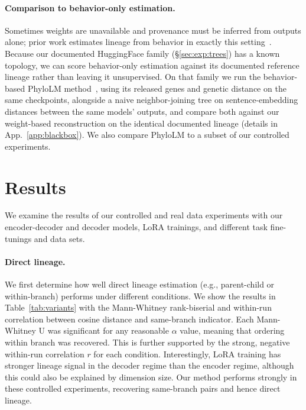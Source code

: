 \documentclass{article}
\theoremstyle{definition}
\theoremstyle{plain}
\begin{document}
\paragraph{Comparison to behavior-only estimation.}
\label{sec:exp:blackbox}
Sometimes weights are unavailable and provenance must be inferred from outputs alone; prior work estimates lineage from behavior in exactly this setting~\citep{wu2026llmdna, yax2025phylolm}. Because our documented HuggingFace family (\S\ref{sec:exp:trees}) has a known topology, we can score behavior-only estimation against its documented reference lineage rather than leaving it unsupervised. On that family we run the behavior-based PhyloLM method~\citep{yax2025phylolm}, using its released genes and genetic distance on the same checkpoints, alongside a naive neighbor-joining tree on sentence-embedding distances between the same models' outputs, and compare both against our weight-based reconstruction on the identical documented lineage (details in App.~\ref{app:blackbox}). We also compare PhyloLM to a subset of our controlled experiments.


\section{Results}
\label{sec:results}


We examine the results of our controlled and real data experiments with our encoder-decoder and decoder models, LoRA trainings, and different task fine-tunings and data sets.


\paragraph{Direct lineage.}
We first determine how well direct lineage estimation (e.g., parent-child or within-branch) performs under different conditions.  We show the results in Table~\ref{tab:variants} with the Mann-Whitney rank-biserial and  within-run correlation between cosine distance and same-branch indicator.  Each Mann-Whitney U was significant for any reasonable $\alpha$ value, meaning that ordering within branch was recovered.  This is further supported by the strong, negative within-run correlation $r$ for each condition.  Interestingly, LoRA training has stronger lineage signal in the decoder regime than the encoder regime, although this could also be explained by dimension size.  Our method performs strongly in these controlled experiments, recovering same-branch pairs and hence direct lineage.
\end{document}
